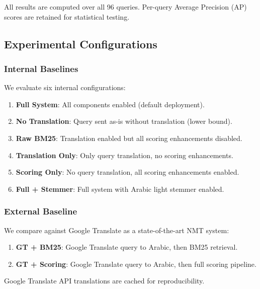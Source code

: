 \documentclass[preprint,12pt,authoryear]{elsarticle}
\begin{document}
All results are computed over all 96 queries. Per-query Average Precision (AP) scores are retained for statistical testing.

\subsection{Experimental Configurations}

\subsubsection{Internal Baselines}
We evaluate six internal configurations:
\begin{enumerate}
    \item \textbf{Full System}: All components enabled (default deployment).
    \item \textbf{No Translation}: Query sent as-is without translation (lower bound).
    \item \textbf{Raw BM25}: Translation enabled but all scoring enhancements disabled.
    \item \textbf{Translation Only}: Only query translation, no scoring enhancements.
    \item \textbf{Scoring Only}: No query translation, all scoring enhancements enabled.
    \item \textbf{Full + Stemmer}: Full system with Arabic light stemmer enabled.
\end{enumerate}

\subsubsection{External Baseline}
We compare against Google Translate as a state-of-the-art NMT system:
\begin{enumerate}
    \item \textbf{GT + BM25}: Google Translate query to Arabic, then BM25 retrieval.
    \item \textbf{GT + Scoring}: Google Translate query to Arabic, then full scoring pipeline.
\end{enumerate}

Google Translate API translations are cached for reproducibility.
\end{document}
